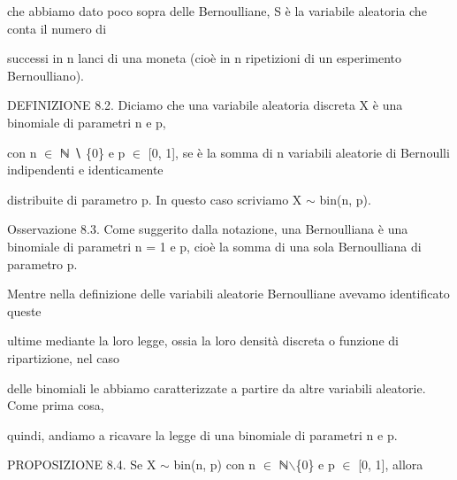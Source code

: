 \documentclass[a4paper,portrait,12pt]{article}
\begin{document}
\begin{flushleft}
che abbiamo dato poco sopra delle Bernoulliane, S \`{e} la variabile aleatoria che conta il numero di
\end{flushleft}


\begin{flushleft}
successi in n lanci di una moneta (cio\`{e} in n ripetizioni di un esperimento Bernoulliano).
\end{flushleft}


\begin{flushleft}
DEFINIZIONE 8.2. Diciamo che una variabile aleatoria discreta X \`{e} una binomiale di parametri n e p,
\end{flushleft}


\begin{flushleft}
con n $\in$ ℕ ∖ \{0\} e p $\in$ [0, 1], se \`{e} la somma di n variabili aleatorie di Bernoulli indipendenti e identicamente
\end{flushleft}


\begin{flushleft}
distribuite di parametro p. In questo caso scriviamo X $\sim$ bin(n, p).
\end{flushleft}


\begin{flushleft}
Osservazione 8.3. Come suggerito dalla notazione, una Bernoulliana \`{e} una binomiale di parametri n = 1 e p, cio\`{e} la somma di una sola Bernoulliana di parametro p.
\end{flushleft}


\begin{flushleft}
Mentre nella definizione delle variabili aleatorie Bernoulliane avevamo identificato queste
\end{flushleft}


\begin{flushleft}
ultime mediante la loro legge, ossia la loro densit\`{a} discreta o funzione di ripartizione, nel caso
\end{flushleft}


\begin{flushleft}
delle binomiali le abbiamo caratterizzate a partire da altre variabili aleatorie. Come prima cosa,
\end{flushleft}


\begin{flushleft}
quindi, andiamo a ricavare la legge di una binomiale di parametri n e p.
\end{flushleft}


\begin{flushleft}
PROPOSIZIONE 8.4. Se X $\sim$ bin(n, p) con n $\in$ ℕ\ensuremath{\backslash}\{0\} e p $\in$ [0, 1], allora
\end{flushleft}
\end{document}

